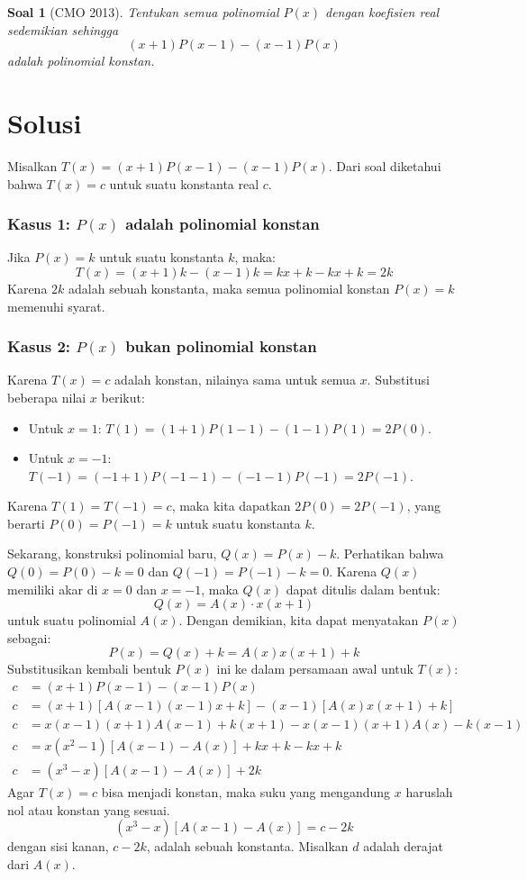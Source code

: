 \documentclass[12pt]{article}
\theoremstyle{mystyle}
\newtheorem{problem}{Soal}
\begin{document}
\begin{problem}[CMO 2013]
Tentukan semua polinomial $P(x)$ dengan koefisien real sedemikian sehingga
\[ (x+1)P(x-1) - (x-1)P(x) \]
adalah polinomial konstan.
\end{problem}

\section*{Solusi}

Misalkan $T(x) = (x+1)P(x-1) - (x-1)P(x)$. Dari soal diketahui bahwa $T(x)=c$ untuk suatu konstanta real $c$.

\subsubsection*{Kasus 1: $P(x)$ adalah polinomial konstan}
Jika $P(x) = k$ untuk suatu konstanta $k$, maka:
\[ T(x) = (x+1)k - (x-1)k = kx + k - kx + k = 2k \]
Karena $2k$ adalah sebuah konstanta, maka semua polinomial konstan $P(x)=k$ memenuhi syarat.

\subsubsection*{Kasus 2: $P(x)$ bukan polinomial konstan}
Karena $T(x)=c$ adalah konstan, nilainya sama untuk semua $x$. Substitusi beberapa nilai $x$ berikut:
\begin{itemize}
    \item Untuk $x=1$: \quad $T(1) = (1+1)P(1-1) - (1-1)P(1) = 2P(0)$.
    \item Untuk $x=-1$: \quad $T(-1) = (-1+1)P(-1-1) - (-1-1)P(-1) = 2P(-1)$.
\end{itemize}
Karena $T(1) = T(-1) = c$, maka kita dapatkan $2P(0) = 2P(-1)$, yang berarti $P(0) = P(-1) = k$ untuk suatu konstanta $k$.

Sekarang, konstruksi polinomial baru, $Q(x) = P(x) - k$.
Perhatikan bahwa $Q(0) = P(0) - k = 0$ dan $Q(-1) = P(-1) - k = 0$.
Karena $Q(x)$ memiliki akar di $x=0$ dan $x=-1$, maka $Q(x)$ dapat ditulis dalam bentuk:
\[ Q(x) = A(x) \cdot x(x+1) \]
untuk suatu polinomial $A(x)$. Dengan demikian, kita dapat menyatakan $P(x)$ sebagai:
\[ P(x) = Q(x) + k = A(x)x(x+1) + k \]
Substitusikan kembali bentuk $P(x)$ ini ke dalam persamaan awal untuk $T(x)$:
\begin{align*}
    c &= (x+1)P(x-1) - (x-1)P(x) \\
    c &= (x+1)\left[ A(x-1)(x-1)x + k \right] - (x-1)\left[ A(x)x(x+1) + k \right] \\
    c &= x(x-1)(x+1)A(x-1) + k(x+1) - x(x-1)(x+1)A(x) - k(x-1) \\
    c &= x(x^2-1) \left[ A(x-1) - A(x) \right] + kx + k - kx + k \\
    c &= (x^3-x) \left[ A(x-1) - A(x) \right] + 2k
\end{align*}
Agar $T(x)=c$ bisa menjadi konstan, maka suku yang mengandung $x$ haruslah nol atau konstan yang sesuai.
\[ (x^3-x) \left[ A(x-1) - A(x) \right] = c - 2k \]
dengan sisi kanan, $c-2k$, adalah sebuah konstanta. Misalkan $d$ adalah derajat dari $A(x)$.
\end{document}
